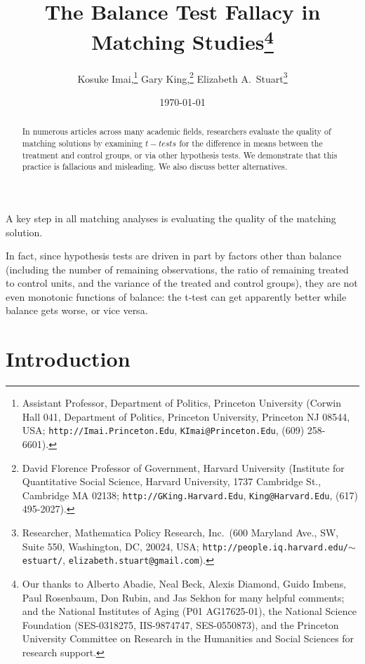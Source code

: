 \documentclass[11pt,titlepage]{article}
\title{The Balance Test Fallacy in Matching Studies\thanks{Our thanks
    to Alberto Abadie, Neal Beck, Alexis Diamond, Guido Imbens, Paul
    Rosenbaum, Don Rubin, and Jas Sekhon for many helpful comments;
    and the National Institutes of Aging (P01 AG17625-01), the
    National Science Foundation (SES-0318275, IIS-9874747,
    SES-0550873), and the Princeton University Committee on Research
    in the Humanities and Social Sciences for research support.}}
\author{Kosuke Imai,\thanks{Assistant Professor, Department of
    Politics, Princeton University (Corwin Hall 041, Department of
    Politics, Princeton University, Princeton NJ 08544, USA;
    \texttt{http://Imai.Princeton.Edu}, \texttt{KImai@Princeton.Edu},
    (609) 258-6601).}
  Gary King,\thanks{David Florence Professor of Government, Harvard
    University (Institute for Quantitative Social Science, Harvard
    University, 1737 Cambridge St., Cambridge MA 02138;
    \texttt{http://GKing.Harvard.Edu}, \texttt{King@Harvard.Edu},
    (617) 495-2027).}
  Elizabeth A.\ Stuart\thanks{Researcher, Mathematica Policy Research,
    Inc.\, (600 Maryland Ave., SW, Suite 550, Washington, DC, 20024,
    USA; \texttt{http://people.iq.harvard.edu/$\sim$estuart/},
    \texttt{elizabeth.stuart@gmail.com}).}}
\date{\today}
\begin{document}
\maketitle

\begin{abstract}
  In numerous articles across many academic fields, researchers
  evaluate the quality of matching solutions by examining $t-tests$
  for the difference in means between the treatment and control
  groups, or via other hypothesis tests.  We demonstrate that this
  practice is fallacious and misleading.  We also discuss better
  alternatives.
\end{abstract}

A key step in all matching analyses is evaluating the quality of the
matching solution.

  In fact, since hypothesis
tests are driven in part by factors other than balance (including the
number of remaining observations, the ratio of remaining treated to
control units, and the variance of the treated and control groups),
they are not even monotonic functions of balance: the t-test can get
apparently better while balance gets worse, or vice versa.
\section{Introduction}



\end{document}
